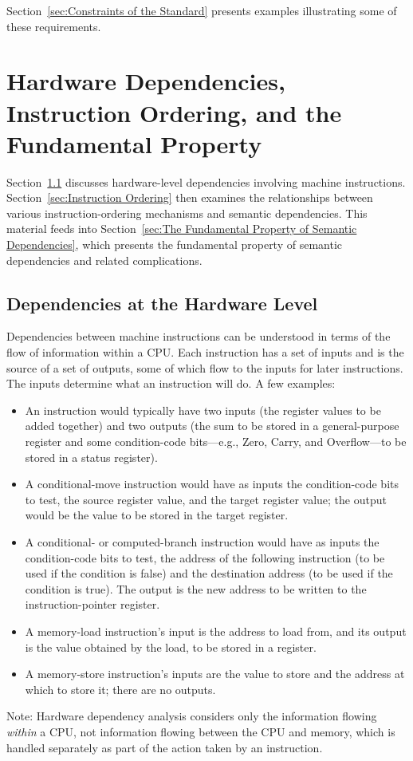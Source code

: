 \documentclass[10]{article}
\begin{document}
Section~\ref{sec:Constraints of the Standard}
presents examples illustrating some of these requirements.

\section{Hardware Dependencies, Instruction Ordering, and the
Fundamental Property}
\label{sec:Hardware Dependencies, Instruction Ordering, and the
Fundamental Property}

Section~\ref{sec:Dependencies at the Hardware Level}
discusses hardware-level dependencies involving machine instructions.
Section~\ref{sec:Instruction Ordering}
then examines the relationships between various instruction-ordering
mechanisms and semantic dependencies.
This material feeds into
Section~\ref{sec:The Fundamental Property of Semantic Dependencies},
which presents the fundamental property of semantic dependencies
and related complications.

\subsection{Dependencies at the Hardware Level}
\label{sec:Dependencies at the Hardware Level}

Dependencies between machine instructions can be understood in terms
of the flow of information within a CPU.
Each instruction has a set of inputs and is the source of a set of outputs,
some of which flow to the inputs for later instructions.
The inputs determine what an instruction will do.
A few examples:
\begin{itemize}
\item	An  instruction would typically have two inputs
	(the register values to be added together) and two outputs
	(the sum to be stored in a general-purpose register and some
	condition-code bits---e.g., Zero, Carry, and Overflow---to be
	stored in a status register).
\item	A conditional-move instruction would have as inputs the
	condition-code bits to test, the source register value, and the
	target register value; the output would be the value to be stored
	in the target register.
\item	A conditional- or computed-branch instruction would have as inputs
	the condition-code bits to test, the address of the following
	instruction (to be used if the condition is false) and the
	destination address (to be used if the condition is true).
	The output is the new address to be written to the
	instruction-pointer register.
\item	A memory-load instruction's input is the address to load from,
	and its output is the value obtained by the load, to be stored
	in a register.
\item	A memory-store instruction's inputs are the value to store and
	the address at which to store it; there are no outputs.
\end{itemize}
Note: Hardware dependency analysis considers only the information
flowing \emph{within} a CPU, not information flowing between the
CPU and memory, which is handled separately as part of the action
taken by an instruction.
\end{document}
